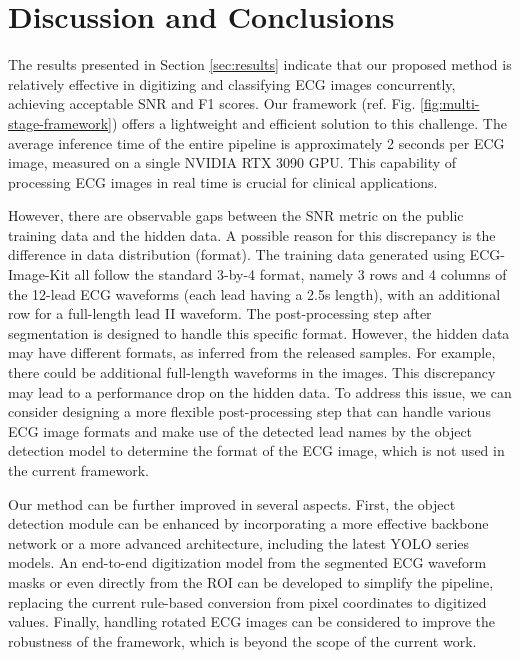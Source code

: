 \section{Discussion and Conclusions}
\label{sec:discu}


The results presented in Section \ref{sec:results} indicate that our proposed method is relatively effective in digitizing and classifying ECG images concurrently, achieving acceptable SNR and F1 scores. Our framework (ref. Fig. \ref{fig:multi-stage-framework}) offers a lightweight and efficient solution to this challenge. The average inference time of the entire pipeline is approximately 2 seconds per ECG image, measured on a single NVIDIA RTX 3090 GPU. This capability of processing ECG images in real time is crucial for clinical applications.

However, there are observable gaps between the SNR metric on the public training data and the hidden data. A possible reason for this discrepancy is the difference in data distribution (format). The training data generated using ECG-Image-Kit \cite{Shivashankara_2024_ECG} all follow the standard 3-by-4 format, namely 3 rows and 4 columns of the 12-lead ECG waveforms (each lead having a 2.5s length), with an additional row for a full-length lead II waveform. The post-processing step after segmentation is designed to handle this specific format. However, the hidden data may have different formats, as inferred from the released samples. For example, there could be additional full-length waveforms in the images. This discrepancy may lead to a performance drop on the hidden data. To address this issue, we can consider designing a more flexible post-processing step that can handle various ECG image formats and make use of the detected lead names by the object detection model to determine the format of the ECG image, which is not used in the current framework.

Our method can be further improved in several aspects. First, the object detection module can be enhanced by incorporating a more effective backbone network or a more advanced architecture, including the latest YOLO series models. An end-to-end digitization model from the segmented ECG waveform masks or even directly from the ROI can be developed to simplify the pipeline, replacing the current rule-based conversion from pixel coordinates to digitized values. Finally, handling rotated ECG images can be considered to improve the robustness of the framework, which is beyond the scope of the current work.
